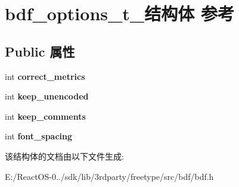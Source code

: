 \hypertarget{structbdf__options__t__}{}\section{bdf\+\_\+options\+\_\+t\+\_\+结构体 参考}
\label{structbdf__options__t__}
\subsection*{Public 属性}
\begin{DoxyCompactItemize}
\item 
\mbox{\label{structbdf__options__t___a7760d998775a313d0de1f82e05f29413}} 
int {\bfseries correct\+\_\+metrics}
\item 
\mbox{\label{structbdf__options__t___abc0d310fd4c255ea2e123c0f740f9343}} 
int {\bfseries keep\+\_\+unencoded}
\item 
\mbox{\label{structbdf__options__t___a3342dbb177bc6fd3d9c886001016af61}} 
int {\bfseries keep\+\_\+comments}
\item 
\mbox{\label{structbdf__options__t___a61ff6d601365441d5d878b0be67d044f}} 
int {\bfseries font\+\_\+spacing}
\end{DoxyCompactItemize}


该结构体的文档由以下文件生成\+:\begin{DoxyCompactItemize}
\item 
E\+:/\+React\+O\+S-\/0../sdk/lib/3rdparty/freetype/src/bdf/bdf.\+h\end{DoxyCompactItemize}
